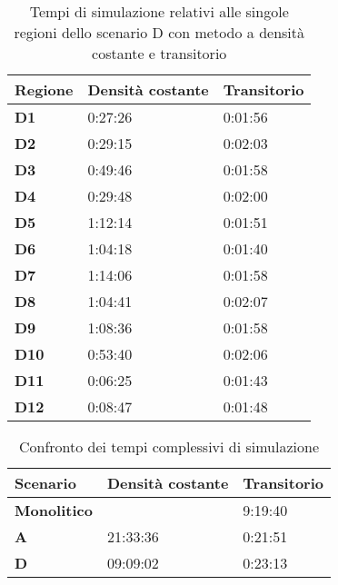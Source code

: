 \documentclass[a4paper, 12pt]{article}
\begin{document}
\begin{table}[h]
  \centering
  \resizebox{0.7\textwidth}{!} {
 \begin{tabular}[t]{ |l|l|l| }
	 	\hline
	\textbf{Regione}	&		\textbf{Densità costante}	&		\textbf{Transitorio}	\\ \hline
	\textbf{D1} 	 &		0:27:26					&		0:01:56		\\ \hline
	\textbf{D2}		 &		0:29:15 				&		0:02:03		\\ \hline
	\textbf{D3}		 &		0:49:46 				&		0:01:58		\\ \hline
	\textbf{D4}		 &		0:29:48 				&		0:02:00		\\ \hline
	\textbf{D5}		 &		1:12:14 				&		0:01:51		\\ \hline
	\textbf{D6}		 &		1:04:18 				&		0:01:40		\\ \hline
	\textbf{D7}		 &		1:14:06 				&		0:01:58		\\ \hline
	\textbf{D8}		 &		1:04:41 				&		0:02:07		\\ \hline
	\textbf{D9}		 &		1:08:36 				&		0:01:58		\\ \hline
	\textbf{D10}	 &		0:53:40 				&		0:02:06		\\ \hline
	\textbf{D11}	 &		0:06:25 				&		0:01:43		\\ \hline
	\textbf{D12}	 &		0:08:47 				&		0:01:48		\\ \hline
	
	
  \end{tabular}
  
  }
  \caption{Tempi di simulazione relativi alle singole regioni dello scenario D con metodo a densità costante e transitorio}
  \label{tab:tabella-dati-simulazioni-D}
\end{table}

\begin{table}[h]
  \centering
  \resizebox{0.7\textwidth}{!} {
  \begin{tabular}{ |l|l|l| }
	\hline
	\textbf{Scenario}	&		\textbf{Densità costante}	&		\textbf{Transitorio}	\\ \hline
	\textbf{Monolitico} &		 						&		9:19:40		\\ \hline
	\textbf{A}			 &		21:33:36 				&		0:21:51		\\ \hline
	\textbf{D}			 &		09:09:02 				&		0:23:13		\\ \hline

  \end{tabular}
  }
  \caption{Confronto dei tempi complessivi di simulazione}
  \label{tab:tabella-confronto}
\end{table}
\end{document}
